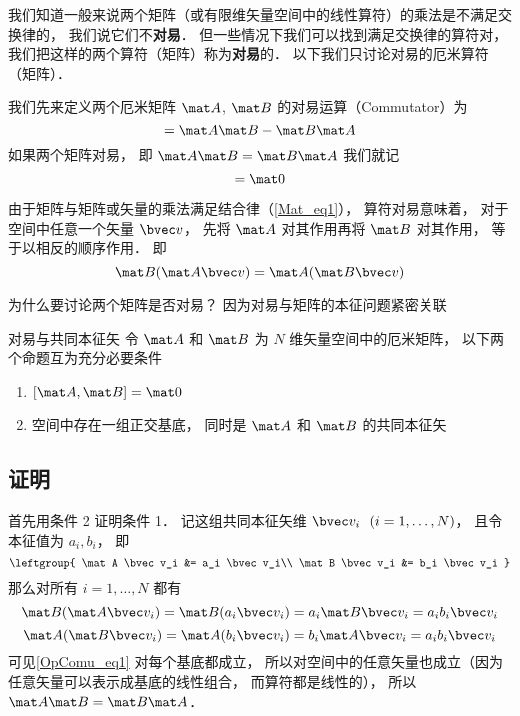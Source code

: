 

我们知道一般来说两个矩阵（或有限维矢量空间中的线性算符）的乘法是不满足交换律的， 我们说它们不\textbf{对易}． 但一些情况下我们可以找到满足交换律的算符对， 我们把这样的两个算符（矩阵）称为\textbf{对易}的． 以下我们只讨论对易的厄米算符（矩阵）．

我们先来定义两个厄米矩阵 $\mat A$, $\mat B$ 的对易运算（Commutator）为
\begin{equation}
[\mat A, \mat B] = \mat A \mat B - \mat B \mat A
\end{equation}
如果两个矩阵对易， 即 $\mat A \mat B = \mat B \mat A$ 我们就记
\begin{equation}
[\mat A, \mat B] = \mat 0
\end{equation}

由于矩阵与矩阵或矢量的乘法满足结合律（\autoref{Mat_eq1}）， 算符对易意味着， 对于空间中任意一个矢量 $\bvec v$， 先将 $\mat A$ 对其作用再将 $\mat B$ 对其作用， 等于以相反的顺序作用． 即
\begin{equation}\label{OpComu_eq1}
\mat B(\mat A \bvec v) = \mat A (\mat B \bvec v)
\end{equation}

为什么要讨论两个矩阵是否对易？ 因为对易与矩阵的本征问题紧密关联

\begin{theorem}{对易与共同本征矢}
令 $\mat A$ 和 $\mat B$ 为 $N$ 维矢量空间中的厄米矩阵， 以下两个命题互为充分必要条件
\begin{enumerate}
\item $[\mat A, \mat B] = \mat 0$
\item 空间中存在一组正交基底， 同时是 $\mat A$ 和 $\mat B$ 的共同本征矢
\end{enumerate}
\end{theorem}

\subsection{证明}
首先用条件 2 证明条件 1． 记这组共同本征矢维 $\bvec v_i \ \ (i = 1, \dots , N)$， 且令本征值为 $a_i, b_i$， 即
\begin{equation}
\leftgroup{
\mat A \bvec v_i &= a_i \bvec v_i\\
\mat B \bvec v_i &= b_i \bvec v_i
}
\end{equation}
那么对所有 $i = 1, \dots, N$ 都有
\begin{equation}
\mat B (\mat A \bvec v_i) = \mat B (a_i \bvec v_i) = a_i \mat B \bvec v_i = a_i b_i \bvec v_i
\end{equation}
\begin{equation}
\mat A (\mat B \bvec v_i) = \mat A (b_i \bvec v_i) = b_i \mat A \bvec v_i = a_i b_i \bvec v_i
\end{equation}
可见\autoref{OpComu_eq1} 对每个基底都成立， 所以对空间中的任意矢量也成立（因为任意矢量可以表示成基底的线性组合， 而算符都是线性的）， 所以 $\mat A \mat B = \mat B \mat A$．

